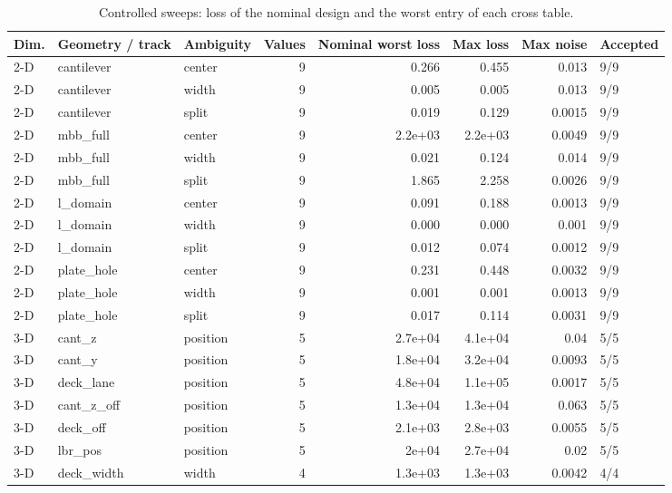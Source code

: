 \begin{table}[t]
\centering\small
\caption{Controlled sweeps: loss of the nominal design and the worst entry of each cross table.}
\label{tab:tab_controlled}
\begin{tabular}{lllrrrrl}
\toprule
Dim. & Geometry / track & Ambiguity & Values & Nominal worst loss & Max loss & Max noise & Accepted \\
\midrule
2-D & cantilever & center & 9 & 0.266 & 0.455 & 0.013 & 9/9 \\
2-D & cantilever & width & 9 & 0.005 & 0.005 & 0.013 & 9/9 \\
2-D & cantilever & split & 9 & 0.019 & 0.129 & 0.0015 & 9/9 \\
2-D & mbb\_full & center & 9 & 2.2e+03 & 2.2e+03 & 0.0049 & 9/9 \\
2-D & mbb\_full & width & 9 & 0.021 & 0.124 & 0.014 & 9/9 \\
2-D & mbb\_full & split & 9 & 1.865 & 2.258 & 0.0026 & 9/9 \\
2-D & l\_domain & center & 9 & 0.091 & 0.188 & 0.0013 & 9/9 \\
2-D & l\_domain & width & 9 & 0.000 & 0.000 & 0.001 & 9/9 \\
2-D & l\_domain & split & 9 & 0.012 & 0.074 & 0.0012 & 9/9 \\
2-D & plate\_hole & center & 9 & 0.231 & 0.448 & 0.0032 & 9/9 \\
2-D & plate\_hole & width & 9 & 0.001 & 0.001 & 0.0013 & 9/9 \\
2-D & plate\_hole & split & 9 & 0.017 & 0.114 & 0.0031 & 9/9 \\
3-D & cant\_z & position & 5 & 2.7e+04 & 4.1e+04 & 0.04 & 5/5 \\
3-D & cant\_y & position & 5 & 1.8e+04 & 3.2e+04 & 0.0093 & 5/5 \\
3-D & deck\_lane & position & 5 & 4.8e+04 & 1.1e+05 & 0.0017 & 5/5 \\
3-D & cant\_z\_off & position & 5 & 1.3e+04 & 1.3e+04 & 0.063 & 5/5 \\
3-D & deck\_off & position & 5 & 2.1e+03 & 2.8e+03 & 0.0055 & 5/5 \\
3-D & lbr\_pos & position & 5 & 2e+04 & 2.7e+04 & 0.02 & 5/5 \\
3-D & deck\_width & width & 4 & 1.3e+03 & 1.3e+03 & 0.0042 & 4/4 \\
\bottomrule
\end{tabular}
\end{table}
